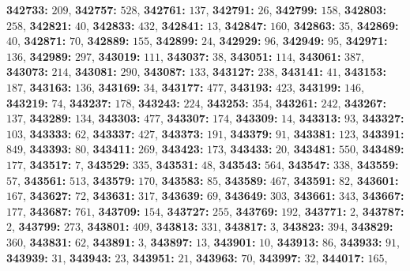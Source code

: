 \textsf{\bfseries 342733:} $209$, \textsf{\bfseries 342757:} $528$, \textsf{\bfseries 342761:} $137$, \textsf{\bfseries 342791:} $26$, \textsf{\bfseries 342799:} $158$, \textsf{\bfseries 342803:} $258$, \textsf{\bfseries 342821:} $40$, \textsf{\bfseries 342833:} $432$, \textsf{\bfseries 342841:} $13$, \textsf{\bfseries 342847:} $160$, \textsf{\bfseries 342863:} $35$, \textsf{\bfseries 342869:} $40$, \textsf{\bfseries 342871:} $70$, \textsf{\bfseries 342889:} $155$, \textsf{\bfseries 342899:} $24$, \textsf{\bfseries 342929:} $96$, \textsf{\bfseries 342949:} $95$, \textsf{\bfseries 342971:} $136$, \textsf{\bfseries 342989:} $297$, \textsf{\bfseries 343019:} $111$, \textsf{\bfseries 343037:} $38$, \textsf{\bfseries 343051:} $114$, \textsf{\bfseries 343061:} $387$, \textsf{\bfseries 343073:} $214$, \textsf{\bfseries 343081:} $290$, \textsf{\bfseries 343087:} $133$, \textsf{\bfseries 343127:} $238$, \textsf{\bfseries 343141:} $41$, \textsf{\bfseries 343153:} $187$, \textsf{\bfseries 343163:} $136$, \textsf{\bfseries 343169:} $34$, \textsf{\bfseries 343177:} $477$, \textsf{\bfseries 343193:} $423$, \textsf{\bfseries 343199:} $146$, \textsf{\bfseries 343219:} $74$, \textsf{\bfseries 343237:} $178$, \textsf{\bfseries 343243:} $224$, \textsf{\bfseries 343253:} $354$, \textsf{\bfseries 343261:} $242$, \textsf{\bfseries 343267:} $137$, \textsf{\bfseries 343289:} $134$, \textsf{\bfseries 343303:} $477$, \textsf{\bfseries 343307:} $174$, \textsf{\bfseries 343309:} $14$, \textsf{\bfseries 343313:} $93$, \textsf{\bfseries 343327:} $103$, \textsf{\bfseries 343333:} $62$, \textsf{\bfseries 343337:} $427$, \textsf{\bfseries 343373:} $191$, \textsf{\bfseries 343379:} $91$, \textsf{\bfseries 343381:} $123$, \textsf{\bfseries 343391:} $849$, \textsf{\bfseries 343393:} $80$, \textsf{\bfseries 343411:} $269$, \textsf{\bfseries 343423:} $173$, \textsf{\bfseries 343433:} $20$, \textsf{\bfseries 343481:} $550$, \textsf{\bfseries 343489:} $177$, \textsf{\bfseries 343517:} $7$, \textsf{\bfseries 343529:} $335$, \textsf{\bfseries 343531:} $48$, \textsf{\bfseries 343543:} $564$, \textsf{\bfseries 343547:} $338$, \textsf{\bfseries 343559:} $57$, \textsf{\bfseries 343561:} $513$, \textsf{\bfseries 343579:} $170$, \textsf{\bfseries 343583:} $85$, \textsf{\bfseries 343589:} $467$, \textsf{\bfseries 343591:} $82$, \textsf{\bfseries 343601:} $167$, \textsf{\bfseries 343627:} $72$, \textsf{\bfseries 343631:} $317$, \textsf{\bfseries 343639:} $69$, \textsf{\bfseries 343649:} $303$, \textsf{\bfseries 343661:} $343$, \textsf{\bfseries 343667:} $177$, \textsf{\bfseries 343687:} $761$, \textsf{\bfseries 343709:} $154$, \textsf{\bfseries 343727:} $255$, \textsf{\bfseries 343769:} $192$, \textsf{\bfseries 343771:} $2$, \textsf{\bfseries 343787:} $2$, \textsf{\bfseries 343799:} $273$, \textsf{\bfseries 343801:} $409$, \textsf{\bfseries 343813:} $331$, \textsf{\bfseries 343817:} $3$, \textsf{\bfseries 343823:} $394$, \textsf{\bfseries 343829:} $360$, \textsf{\bfseries 343831:} $62$, \textsf{\bfseries 343891:} $3$, \textsf{\bfseries 343897:} $13$, \textsf{\bfseries 343901:} $10$, \textsf{\bfseries 343913:} $86$, \textsf{\bfseries 343933:} $91$, \textsf{\bfseries 343939:} $31$, \textsf{\bfseries 343943:} $23$, \textsf{\bfseries 343951:} $21$, \textsf{\bfseries 343963:} $70$, \textsf{\bfseries 343997:} $32$, \textsf{\bfseries 344017:} $165$, 

